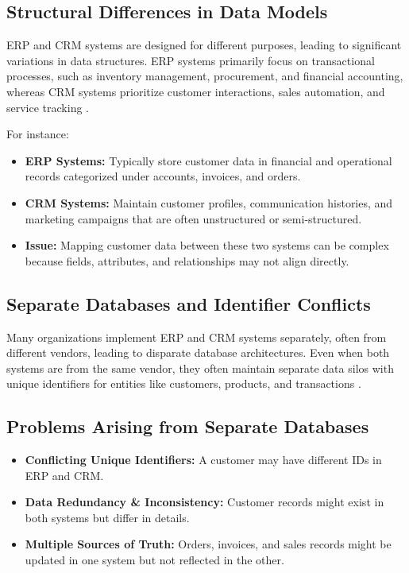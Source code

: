 \subsection{Structural Differences in Data Models}
ERP and CRM systems are designed for different purposes, leading to significant variations in data structures. ERP systems primarily focus on transactional processes, such as inventory management, procurement, and financial accounting, whereas CRM systems prioritize customer interactions, sales automation, and service tracking \cite{yanjing2009}.

For instance:
\begin{itemize}
    \item \textbf{ERP Systems:} Typically store customer data in financial and operational records categorized under accounts, invoices, and orders.
    \item \textbf{CRM Systems:} Maintain customer profiles, communication histories, and marketing campaigns that are often unstructured or semi-structured.
    \item \textbf{Issue:} Mapping customer data between these two systems can be complex because fields, attributes, and relationships may not align directly.
\end{itemize}

\subsection{Separate Databases and Identifier Conflicts}
Many organizations implement ERP and CRM systems separately, often from different vendors, leading to disparate database architectures. Even when both systems are from the same vendor, they often maintain separate data silos with unique identifiers for entities like customers, products, and transactions \cite{tomic2016}.

\subsection{Problems Arising from Separate Databases}
\begin{itemize}
    \item \textbf{Conflicting Unique Identifiers:} A customer may have different IDs in ERP and CRM.
    \item \textbf{Data Redundancy \& Inconsistency:} Customer records might exist in both systems but differ in details.
    \item \textbf{Multiple Sources of Truth:} Orders, invoices, and sales records might be updated in one system but not reflected in the other.
\end{itemize}

